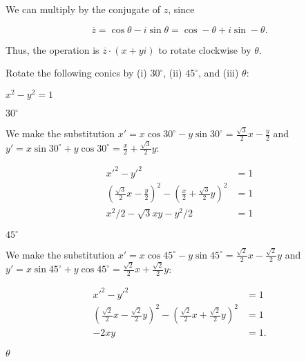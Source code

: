 \documentclass[../gatm_answers.tex]{subfiles}
\begin{document}
We can multiply by the conjugate of $z$, since

$$\overline{z}=\cos\theta - i\sin\theta = \cos-\theta + i\sin-\theta.$$

Thus, the operation is $\overline{z}\cdot (x+yi)$ to rotate clockwise by $\theta$.

\begin{outer_problem}
\item Rotate the following conics by (i) $30^\circ$, (ii) $45^\circ$, and (iii) $\theta$:
\end{outer_problem}

\begin{inner_problem}[start=1]
\item $x^2-y^2=1$
\end{inner_problem}

\begin{iinner_problem}[start=1]
\item $30^\circ$
\end{iinner_problem}

We make the substitution $x'=x \cos 30^\circ - y\sin 30^\circ=\frac{\sqrt{3}}{2}x-\frac{y}{2}$ and $y'=x\sin 30^\circ + y\cos 30^\circ=\frac{x}{2}+\frac{\sqrt{3}}{2}y$:

\begin{align*}
x'^2-y'^2&=1 \\
\left(\frac{\sqrt{3}}{2}x-\frac{y}{2}\right)^2 - \left(\frac{x}{2}+\frac{\sqrt{3}}{2}y\right)^2 &= 1 \\
x^2/2 - \sqrt{3} x y - y^2/2 &= 1
\end{align*}

\begin{iinner_problem}
\item $45^\circ$
\end{iinner_problem}

We make the substitution $x'=x \cos 45^\circ - y\sin 45^\circ=\frac{\sqrt{2}}{2}x-\frac{\sqrt{2}}{2}y$ and $y'=x\sin 45^\circ + y\cos 45^\circ=\frac{\sqrt{2}}{2}x+\frac{\sqrt{2}}{2}y$:

\begin{align*}
x'^2-y'^2 &= 1 \\
\left(\frac{\sqrt{2}}{2}x-\frac{\sqrt{2}}{2}y\right)^2 - \left(\frac{\sqrt{2}}{2}x+\frac{\sqrt{2}}{2}y\right)^2 &= 1 \\
-2xy &= 1.
\end{align*}

\begin{iinner_problem}
\item $\theta$
\end{iinner_problem}
\end{document}
